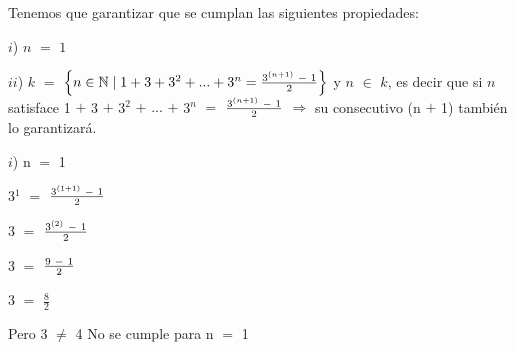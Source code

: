 \documentclass[12pt]{article}
\newenvironment{MyColorPar}[1]{%
    \leavevmode\color{#1}\ignorespaces%
}{%
}%
\begin{document}
 \begin{MyColorPar}{Boston Blue}
 
 Tenemos que garantizar que se cumplan las siguientes propiedades: 
 
\end{MyColorPar} \vspace{0.2cm}

 \begin{MyColorPar}{verde_manzana}
 $i$) $n$ $=$ $1$
 
 $ii$) $k$ $=$ $\left\{n \in \mathbb{N} \mid 1 + 3 + 3^{2} + ... + 3^{n} = {\LARGE{{\frac{3^{(n+1)} \hspace{0.1cm} - \hspace{0.1cm} 1}{2}}}} \right\}$ y $n$ $\in$ $k$, es decir que si $n$ satisface 1 $+$ 3 $+$ 3$^{2}$ $+$ $...$ $+$ 3$^{n}$ $=$ {\LARGE{{$\frac{3^{(n+1)} \hspace{0.1cm} - \hspace{0.1cm} 1}{2}$}}} \hspace{0.2cm} $\Longrightarrow$ \hspace{0.2cm} su consecutivo (n $+$ 1) también lo garantizará.
 \end{MyColorPar} \vspace{0.2cm}

 
{\textcolor{verde_manzana}{$i$)  n $=$ 1}} \vspace{0.2cm}

\hspace{4cm} 3$^{1}$ $=$ {\LARGE{{$\frac{3^{(1+1)} \hspace{0.1cm} - \hspace{0.1cm} 1}{2}$}}} \vspace{0.2cm}

\hspace{4cm} 3 $=$ {\LARGE{{$\frac{3^{(2)} \hspace{0.1cm} - \hspace{0.1cm} 1}{2}$}}} \vspace{0.2cm}

\hspace{4cm} 3 $=$ {\LARGE{{$\frac{9 \hspace{0.1cm} - \hspace{0.1cm} 1}{2}$}}} \vspace{0.2cm}

\hspace{4cm} 3 $=$ {\LARGE{{$\frac{8}{2}$}}} \vspace{0.2cm}

\hspace{2cm} Pero \hspace{0.8cm} 3 $\neq$ 4 \hspace{0.2cm} No se cumple para n $=$ 1 \vspace{0.2cm}
\end{document}
